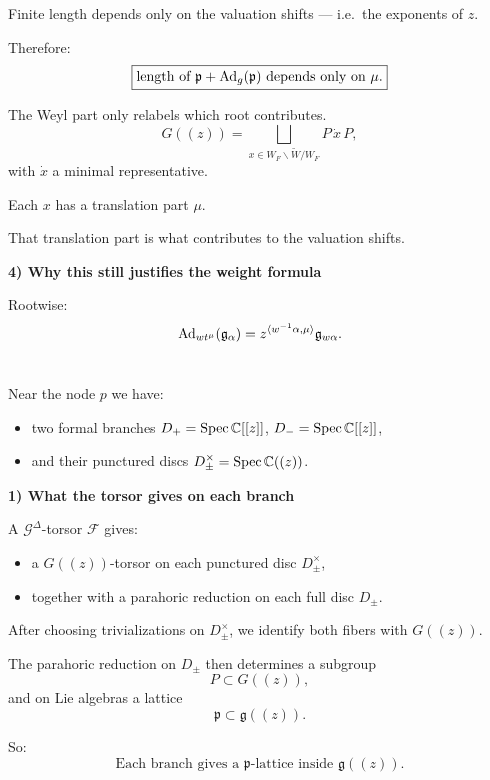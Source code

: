 \documentclass[12pt]{article}
\begin{document}
Finite length depends only on the valuation shifts --- i.e.\ the exponents of $z$.

Therefore:
\[
\boxed{
\text{length of } \mathfrak{p} + \operatorname{Ad}_g(\mathfrak{p})
\text{ depends only on } \mu.
}
\]

The Weyl part only relabels which root contributes.
\[
G((z))
=
\bigsqcup_{x \in W_F \backslash \widetilde{W} / W_F}
P\, \dot{x}\, P,
\]
with $\dot{x}$ a minimal representative.

Each $x$ has a translation part $\mu$.

That translation part is what contributes to the valuation shifts.

\medskip

\noindent\textbf{4) Why this still justifies the weight formula}

Rootwise:
\[
\operatorname{Ad}_{w t^\mu}(\mathfrak{g}_\alpha)
=
z^{\langle w^{-1}\alpha, \mu\rangle}\mathfrak{g}_{w\alpha}.
\]
\section{}
Near the node $p$ we have:
\begin{itemize}
    \item two formal branches $D_+ = \operatorname{Spec} \mathbb{C}[[z]]$, $D_- = \operatorname{Spec} \mathbb{C}[[z]]$,
    \item and their punctured discs $D_\pm^\times = \operatorname{Spec} \mathbb{C}((z))$.
\end{itemize}

\medskip

\noindent\textbf{1) What the torsor gives on each branch}

A $\mathcal{G}^\Delta$-torsor $\mathcal{F}$ gives:
\begin{itemize}
    \item a $G((z))$-torsor on each punctured disc $D_\pm^\times$,
    \item together with a parahoric reduction on each full disc $D_\pm$.
\end{itemize}

After choosing trivializations on $D_\pm^\times$, we identify both fibers with $G((z))$.

The parahoric reduction on $D_\pm$ then determines a subgroup
\[
P \subset G((z)),
\]
and on Lie algebras a lattice
\[
\mathfrak{p} \subset \mathfrak{g}((z)).
\]

So:
\[
\boxed{
\text{Each branch gives a } \mathfrak{p}\text{-lattice inside } \mathfrak{g}((z)).
}
\]

\medskip
\end{document}
